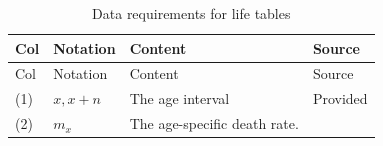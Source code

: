 \documentclass[]{book}
\begin{document}
\begin{longtable}[]{@{}llll@{}}
\caption{\label{tab:deatht} Data requirements for life tables}\tabularnewline
\toprule
\begin{minipage}[b]{0.12\columnwidth}\raggedright
Col\strut
\end{minipage} & \begin{minipage}[b]{0.22\columnwidth}\raggedright
Notation\strut
\end{minipage} & \begin{minipage}[b]{0.44\columnwidth}\raggedright
Content\strut
\end{minipage} & \begin{minipage}[b]{0.10\columnwidth}\raggedright
Source\strut
\end{minipage}\tabularnewline
\midrule
\endfirsthead
\toprule
\begin{minipage}[b]{0.12\columnwidth}\raggedright
Col\strut
\end{minipage} & \begin{minipage}[b]{0.22\columnwidth}\raggedright
Notation\strut
\end{minipage} & \begin{minipage}[b]{0.44\columnwidth}\raggedright
Content\strut
\end{minipage} & \begin{minipage}[b]{0.10\columnwidth}\raggedright
Source\strut
\end{minipage}\tabularnewline
\midrule
\endhead
\begin{minipage}[t]{0.12\columnwidth}\raggedright
(1)\strut
\end{minipage} & \begin{minipage}[t]{0.22\columnwidth}\raggedright
\(x,x+n\)\strut
\end{minipage} & \begin{minipage}[t]{0.44\columnwidth}\raggedright
The age interval\strut
\end{minipage} & \begin{minipage}[t]{0.10\columnwidth}\raggedright
Provided\strut
\end{minipage}\tabularnewline
\begin{minipage}[t]{0.12\columnwidth}\raggedright
(2)\strut
\end{minipage} & \begin{minipage}[t]{0.22\columnwidth}\raggedright
\(m_x\)\strut
\end{minipage} & \begin{minipage}[t]{0.44\columnwidth}\raggedright
The age-specific death rate.\strut

\end{minipage}
\end{longtable}
\end{document}

